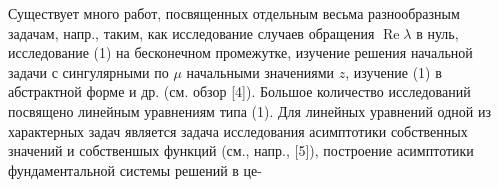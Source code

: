 \documentclass[10pt]{article}
\begin{document}
Существует много работ, посвященных отдельным весьма разнообразным задачам, напр., таким, как исследование случаев обращения $\operatorname{Re} \lambda$ в нуль, исследование (1) на бесконечном промежутке, изучение решения начальной задачи с сингулярными по $\mu$ начальными значениями $z$, изучение (1) в абстрактной форме и др. (см. обзор [4]). Большое количество исследований посвящено линейным уравнениям типа (1). Для линейных уравнений одной из характерных задач является задача исследования асимптотики собственных значений и собственшых функций (см., напр., [5]), построение асимптотики фундаментальной системы решений в це-
\end{document}

